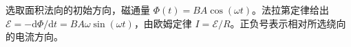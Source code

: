 选取面积法向的初始方向，磁通量 $\Phi(t)=BA\cos(\omega t)$。法拉第定律给出 $\mathcal E=-\mathrm d\Phi/\mathrm dt=BA\omega\sin(\omega t)$，由欧姆定律 $I=\mathcal E/R$。正负号表示相对所选绕向的电流方向。

